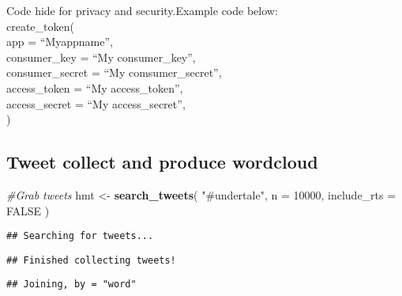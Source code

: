 \documentclass[]{article}
\newenvironment{Shaded}{\begin{snugshade}}{\end{snugshade}}
\newcommand{\KeywordTok}[1]{\textcolor[rgb]{0.13,0.29,0.53}{\textbf{#1}}}
\newcommand{\DataTypeTok}[1]{\textcolor[rgb]{0.13,0.29,0.53}{#1}}
\newcommand{\DecValTok}[1]{\textcolor[rgb]{0.00,0.00,0.81}{#1}}
\newcommand{\StringTok}[1]{\textcolor[rgb]{0.31,0.60,0.02}{#1}}
\newcommand{\CommentTok}[1]{\textcolor[rgb]{0.56,0.35,0.01}{\textit{#1}}}
\newcommand{\OtherTok}[1]{\textcolor[rgb]{0.56,0.35,0.01}{#1}}
\newcommand{\OperatorTok}[1]{\textcolor[rgb]{0.81,0.36,0.00}{\textbf{#1}}}
\newcommand{\NormalTok}[1]{#1}
\begin{document}
Code hide for privacy and security.Example code below:\\
create\_token(\\
app = ``Myappname'',\\
consumer\_key = ``My consumer\_key'',\\
consumer\_secret = ``My comsumer\_secret'',\\
access\_token = ``My access\_token'',\\
access\_secret = ``My access\_secret'',\\
)

\subsection{Tweet collect and produce
wordcloud}\label{tweet-collect-and-produce-wordcloud}

\begin{Shaded}
\begin{Highlighting}[]
\CommentTok{#Grab tweets}
\NormalTok{hmt <-}\StringTok{ }\KeywordTok{search_tweets}\NormalTok{(}
  \StringTok{"#undertale"}\NormalTok{, }\DataTypeTok{n =} \DecValTok{10000}\NormalTok{, }\DataTypeTok{include_rts =} \OtherTok{FALSE}
\NormalTok{)}
\end{Highlighting}
\end{Shaded}

\begin{verbatim}
## Searching for tweets...
\end{verbatim}

\begin{verbatim}
## Finished collecting tweets!
\end{verbatim}

\begin{Shaded}
\end{Shaded}

\begin{verbatim}
## Joining, by = "word"
\end{verbatim}
\end{document}

